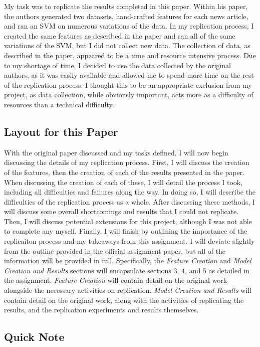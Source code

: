 \documentclass{article}
\begin{document}
My task was to replicate the results completed in this paper. Within his paper, the authors generated two datasets, hand-crafted features for each news article, and ran an SVM on numerous variations of the data. In my replication process, I created the same features as described in the paper and ran all of the same variations of the SVM, but I did not collect new data. The collection of data, as described in the paper, appeared to be a time and resource intensive process. Due to my shortage of time, I decided to use the data collected by the original authors, as it was easily available and allowed me to spend more time on the rest of the replication process. I thought this to be an appropriate exclusion from my project, as data collection, while obviously important, acts more as a difficulty of resources than a technical difficulty. 

\subsection{Layout for this Paper}

With the original paper discussed and my tasks defined, I will now begin discussing the details of my replication process. First, I will discuss the creation of the features, then the creation of each of the results presented in the paper. When discussing the creation of each of these, I will detail the process I took, including all difficulties and failures along the way. In doing so, I will describe the difficulties of the replication process as a whole. After discussing these methods, I will discuss some overall shortcomings and results that I could not replicate. Then, I will discuss potential extensions for this project, although I was not able to complete any myself. Finally, I will finish by outlining the importance of the replicaiton process and my takeaways from this assignment. I will deviate slightly from the outline provided in the official assignment paper, but all of the information will be provided in full. Specifically, the \emph{Feature Creation} and \emph{Model Creation and Results} sections will encapsulate sections 3, 4, and 5 as detailed in the assignment. \emph{Feature Creation} will contain detail on the original work alongside the necessary activities on replication. \emph{Model Creation and Results} will contain detail on the original work, along with the activities of replicating the results, and the replication experiments and results themselves.

\subsection{Quick Note}
\end{document}
